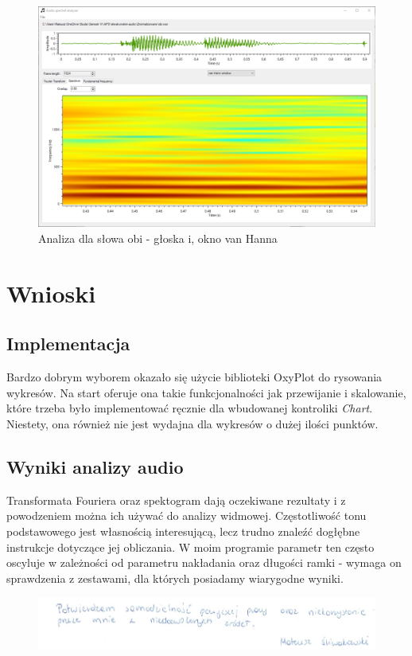 \documentclass{article}
\begin{document}
\begin{figure}[H]
\includegraphics[width=6in]{scr18.png}
\centering
\caption{Analiza dla słowa obi - głoska i, okno van Hanna}
\end{figure}

\section{Wnioski}
\subsection{Implementacja}
Bardzo dobrym wyborem okazało się użycie biblioteki OxyPlot do rysowania wykresów. Na start oferuje ona takie funkcjonalności jak przewijanie i skalowanie, które trzeba było implementować ręcznie dla wbudowanej kontroliki \textit{Chart}. Niestety, ona również nie jest wydajna dla wykresów o dużej ilości punktów.
\subsection{Wyniki analizy audio}
Transformata Fouriera oraz spektogram dają oczekiwane rezultaty i z powodzeniem można ich używać do analizy widmowej. Częstotliwość tonu podstawowego jest własnością interesującą, lecz trudno znaleźć dogłębne instrukcje dotyczące jej obliczania. W moim programie parametr ten często oscyluje w zależności od parametru nakładania oraz długości ramki - wymaga on sprawdzenia z zestawami, dla których posiadamy wiarygodne wyniki.

\begin{figure}[b]
\centering
\includegraphics[width=5in]{bottom.png}
\end{figure}
\end{document}
